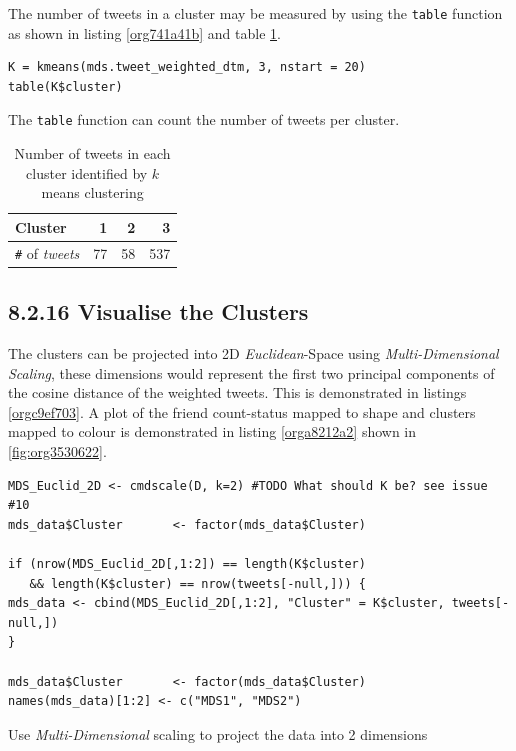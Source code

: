 \documentclass[11pt]{article}
\begin{document}
The number of tweets in a cluster may be measured by using the \texttt{table} function
as shown in listing \ref{org741a41b} and table \ref{tab:orgdf083a0}.

\begin{listing}[htbp]
\begin{verbatim}
K = kmeans(mds.tweet_weighted_dtm, 3, nstart = 20)
table(K$cluster)
\end{verbatim}
\caption{\label{org741a41b}The \texttt{table} function can count the number of tweets per cluster.}
\end{listing}

\begin{table}[htbp]
\caption{\label{tab:orgdf083a0}Number of tweets in each cluster identified by \(k\) means clustering}
\centering
\begin{tabular}{lrrr}
Cluster & 1 & 2 & 3\\
\hline
\texttt{\#} of \emph{tweets} & 77 & 58 & 537\\
\end{tabular}
\end{table}

\subsection{8.2.16 Visualise the Clusters}
\label{sec:orgc0e365e}
The clusters can be projected into 2D \emph{Euclidean}-Space using \emph{Multi-Dimensional
Scaling}, these dimensions would represent the first two principal components of
the cosine distance of the weighted tweets. This is demonstrated in listings
\ref{orgc9ef703}. A plot of the friend count-status mapped to shape and clusters mapped to
colour is demonstrated in listing \ref{orga8212a2} shown in \ref{fig:org3530622}.

\begin{listing}[htbp]
\begin{verbatim}
MDS_Euclid_2D <- cmdscale(D, k=2) #TODO What should K be? see issue #10
mds_data$Cluster       <- factor(mds_data$Cluster)

if (nrow(MDS_Euclid_2D[,1:2]) == length(K$cluster)
   && length(K$cluster) == nrow(tweets[-null,])) {
mds_data <- cbind(MDS_Euclid_2D[,1:2], "Cluster" = K$cluster, tweets[-null,])
}

mds_data$Cluster       <- factor(mds_data$Cluster)
names(mds_data)[1:2] <- c("MDS1", "MDS2")
\end{verbatim}
\caption{\label{orgc9ef703}Use \emph{Multi-Dimensional} scaling to project the data into 2 dimensions}
\end{listing}
\end{document}

